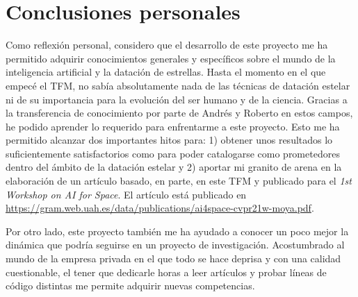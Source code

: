 \section{Conclusiones personales}

Como reflexión personal, considero que el desarrollo de este proyecto me ha permitido adquirir conocimientos generales y específicos sobre el mundo de la inteligencia artificial y la datación de estrellas. Hasta el momento en el que empecé el TFM, no sabía absolutamente nada de las técnicas de datación estelar ni de su importancia para la evolución del ser humano y de la ciencia. Gracias a la transferencia de conocimiento por parte de Andrés y Roberto en estos campos, he podido aprender lo requerido para enfrentarme a este proyecto. Esto me ha permitido alcanzar dos importantes hitos para: 1) obtener unos resultados lo suficientemente satisfactorios como para poder catalogarse como prometedores dentro del ámbito de la datación estelar y 2) aportar mi granito de arena en la elaboración de un artículo basado, en parte, en este TFM y publicado para el \emph{1st Workshop on AI for Space}. El artículo está publicado en \url{https://gram.web.uah.es/data/publications/ai4space-cvpr21w-moya.pdf}.  %

Por otro lado, este proyecto también me ha ayudado a conocer un poco mejor la dinámica que podría seguirse en un proyecto de investigación. Acostumbrado al mundo de la empresa privada en el que todo se hace deprisa y con una calidad cuestionable, el tener que dedicarle horas a leer artículos y probar líneas de código distintas me permite adquirir nuevas competencias.






















